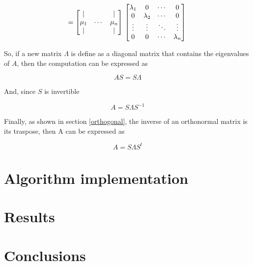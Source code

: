 \documentclass[12pt,journal]{IEEEtran}
\begin{document}
    \[
        =
        \begin{bmatrix}
               |  &        &   |  \\
            \mu_1 & \cdots & \mu_n\\
               |  &        &   |  \\
        \end{bmatrix}\\
        \begin{bmatrix}
            \lambda_1 &      0    & \cdots &   0 \\
                0     & \lambda_2 & \cdots &   0 \\
              \vdots  &   \vdots  & \ddots & \vdots \\
                0     &      0    & \cdots & \lambda_n \\
        \end{bmatrix}\\
    \]

    So, if a new matrix $\Lambda$ is define as a diagonal matrix that contains
    the eigenvalues of $A$, then the computation can be expressed as

    \begin{equation*}
        A S = S \Lambda
    \end{equation*}

    And, since $S$ is invertible

    \begin{equation*}
        A = S \Lambda S^{-1}
    \end{equation*}

    Finally, as shown in section \ref{orthogonal}, the inverse of an orthonormal
    matrix is its traspose, then A can be expressed as

    \begin{equation*}
        A = S \Lambda S^t
    \end{equation*}

\section{Algorithm implementation}

\section{Results}

\section{Conclusions}
\end{document}

